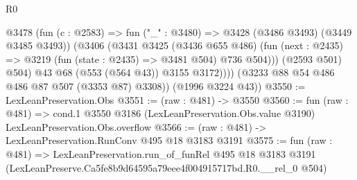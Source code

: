 \begin{lexlean}{R0}
\begin{coremodule}
                @3478
                  (fun (c : @2583) => fun ("_" : @3480) => @3428 (@3486 @3493) (@3449 @3485 @3493))
                  (@3406
                    (@3431
                      @3425
                      (@3436 @655 @486)
                      (fun (next : @2435) => @3219 (fun (state : @2435) => @3481 @504) @736 @504)))
                  (@2593 @501)
                  @504)
                @43
                @68
                (@553 (@564 @43))
                @3155
                @3172))))
        (@3233 @88 @54 @486 @486 @87 @507 (@3353 @87) @3308))
      (@1996 @3224 @43))
@3550 := LexLeanPreservation.Obs
@3551 := (raw : @481) -> @3550
@3560 := fun (raw : @481) =>
  cond.{1} @3550 @3186 (LexLeanPreservation.Obs.value @3190) LexLeanPreservation.Obs.overflow
@3566 := (raw : @481) -> LexLeanPreservation.RunConv @495 @18 @3183 @3191
@3575 := fun (raw : @481) =>
  LexLeanPreservation.run_of_funRel
    @495
    @18
    @3183
    @3191
    (LexLeanPreserve.Ca5fe8b9d64595a79eee4f004915717bd.R0.__rel_0 @504)
\end{coremodule}
\end{lexlean}
